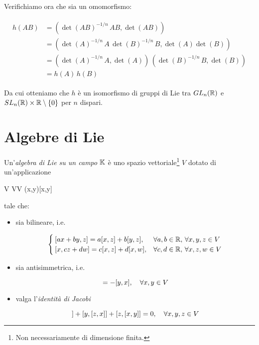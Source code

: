 Verifichiamo ora che sia un omomorfismo:

\begin{align}
	\begin{split}
		h(A B) &= \left( \det(A B)^{-1/n} \, A B, \det(A B) \right) \\
		&= \left( \det(A)^{-1/n} \, A \, \det(B)^{-1/n} \, B, \det(A) \det(B) \right) \\
		&= \left( \det(A)^{-1/n} \, A, \det(A) \right) \, \left( \det(B)^{-1/n} \, B, \det(B) \right) \\
		&= h(A) \, h(B)
	\end{split}
\end{align}

Da cui otteniamo che $ h $ è un isomorfismo di gruppi di Lie tra $ GL_{n}(\mathbb{R}) $ e $ SL_{n}(\mathbb{R}) \times \mathbb{R} \setminus \{0\} $ per $ n $ dispari.

\section{Algebre di Lie}

Un'\textit{algebra di Lie su un campo} $ \mathbb{K} $ è uno spazio vettoriale\footnote{%
	Non necessariamente di dimensione finita.%
} $ V $ dotato di un'applicazione

\map{[,]}
	{V \times V}{V}
	{(x,y)}{[x,y]}

tale che:

\begin{itemize}
	\item sia bilineare, i.e.
	
	\begin{equation}
		\begin{cases}
			[ax+by,z] = a[x,z] + b[y,z], & \forall a,b \in \mathbb{R}, \, \forall x,y,z \in V \\
			[x,cz+dw] = c[x,z] + d[x,w], & \forall c,d \in \mathbb{R}, \, \forall x,z,w \in V
		\end{cases}
	\end{equation}
	
	\item sia antisimmetrica, i.e.
	
	\begin{equation}
		[x,y] = -[y,x] \qcomma \forall x,y \in V
	\end{equation}
	
	\item valga l'\textit{identità di Jacobi}
	
	\begin{equation}
		[x,[y,z]] + [y,[z,x]] + [z,[x,y]] = 0 \qcomma \forall x,y,z \in V
	\end{equation}
\end{itemize}


